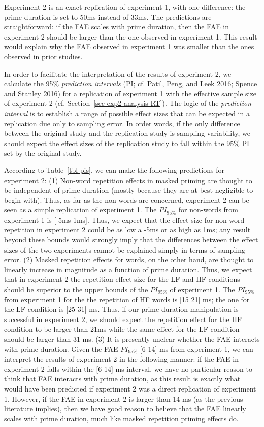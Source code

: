 \documentclass[
]{interact}
\begin{document}
Experiment 2 is an exact replication of experiment 1, with one
difference: the prime duration is set to 50ms instead of 33ms. The
predictions are straightforward: if the FAE scales with prime duration,
then the FAE in experiment 2 should be larger than the one observed in
experiment 1. This result would explain why the FAE observed in
experiment 1 was smaller than the ones observed in prior studies.

In order to facilitate the interpretation of the results of experiment
2, we calculate the 95\% \emph{prediction intervals} (PI; cf. Patil,
Peng, and Leek 2016; Spence and Stanley 2016) for a replication of
experiment 1 with the effective sample size of experiment 2 (cf.
Section~\ref{sec-exp2-analysis-RT}). The logic of the \emph{prediction
interval} is to establish a range of possible effect sizes that can be
expected in a replication due only to sampling error. In order words, if
the only difference between the original study and the replication study
is sampling variability, we should expect the effect sizes of the
replication study to fall within the 95\% PI set by the original study.

According to Table~\ref{tbl-pis}, we can make the following predictions
for experiment 2: (1) Non-word repetition effects in masked priming are
thought to be independent of prime duration (mostly because they are at
best negligible to begin with). Thus, as far as the non-words are
concerned, experiment 2 can be seen as a simple replication of
experiment 1. The \(PI_{95\%}\) for non-words from experiment 1 is
{[}-5ms 1ms{]}. Thus, we expect that the effect size for non-word
repetition in experiment 2 could be as low a -5ms or as high as 1ms; any
result beyond these bounds would strongly imply that the differences
between the effect sizes of the two experiments cannot be explained
simply in terms of sampling error. (2) Masked repetition effects for
words, on the other hand, are thought to linearly increase in magnitude
as a function of prime duration. Thus, we expect that in experiment 2
the repetition effect size for the LF and HF conditions should be
superior to the upper bounds of the \(PI_{95\%}\) of experiment 1. The
\(PI_{95\%}\) from experiment 1 for the the repetition of HF words is
{[}15 21{]} ms; the one for the LF condition is {[}25 31{]} ms. Thus, if
our prime duration manipulation is successful in experiment 2, we should
expect the repetition effect for the HF condition to be larger than 21ms
while the same effect for the LF condition should be larger than 31 ms.
(3) It is presently unclear whether the FAE interacts with prime
duration. Given the FAE \(PI_{95\%}\) {[}6 14{]} ms from experiment 1,
we can interpret the results of experiment 2 in the following manner: if
the FAE in experiment 2 falls within the {[}6 14{]} ms interval, we have
no particular reason to think that FAE interacts with prime duration, as
this result is exactly what would have been predicted if experiment 2
was a direct replication of experiment 1. However, if the FAE in
experiment 2 is larger than 14 ms (as the previous literature implies),
then we have good reason to believe that the FAE linearly scales with
prime duration, much like masked repetition priming effects do.
\end{document}
